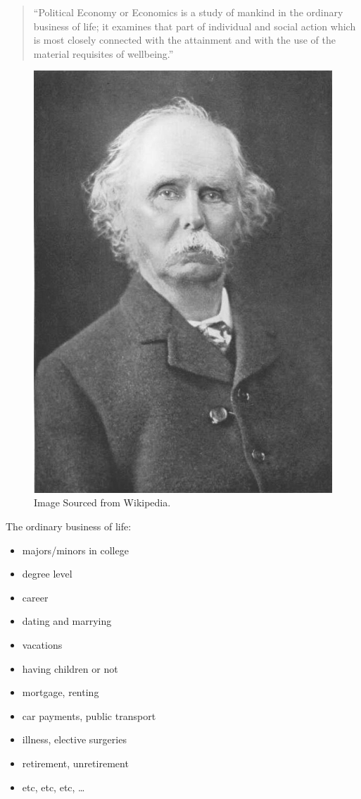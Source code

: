 \documentclass[
]{book}
\providecommand{\tightlist}{%
  \setlength{\itemsep}{0pt}\setlength{\parskip}{0pt}}
\begin{document}
\begin{quote}
``Political Economy or Economics is a study of mankind in the ordinary business of life; it examines that part of individual and social action which is most closely connected with the attainment and with the use of the material requisites of wellbeing.''
\end{quote}

\begin{figure}

{\centering \includegraphics[width=0.5\linewidth]{img/intro/Alfred_Marshall} 

}

\caption{Image Sourced from Wikipedia.}\label{fig:intro02}
\end{figure}

The ordinary business of life:

\begin{itemize}
\tightlist
\item
  majors/minors in college
\item
  degree level
\item
  career
\item
  dating and marrying
\item
  vacations
\item
  having children or not
\item
  mortgage, renting
\item
  car payments, public transport
\item
  illness, elective surgeries
\item
  retirement, unretirement
\item
  etc, etc, etc, \ldots{}
\end{itemize}
\end{document}

